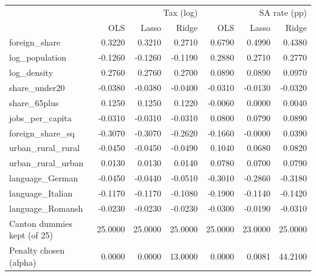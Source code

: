 \begin{tabular}{lrrrrrr}
\toprule
 & \multicolumn{3}{r}{Tax (log)} & \multicolumn{3}{r}{SA rate (pp)} \\
 & OLS & Lasso & Ridge & OLS & Lasso & Ridge \\
\midrule
foreign\_share & 0.3220 & 0.3210 & 0.2710 & 0.6790 & 0.4990 & 0.4380 \\
log\_population & -0.1260 & -0.1260 & -0.1190 & 0.2880 & 0.2710 & 0.2770 \\
log\_density & 0.2760 & 0.2760 & 0.2700 & 0.0890 & 0.0890 & 0.0970 \\
share\_under20 & -0.0380 & -0.0380 & -0.0400 & -0.0310 & -0.0130 & -0.0320 \\
share\_65plus & 0.1250 & 0.1250 & 0.1220 & -0.0060 & 0.0000 & 0.0040 \\
jobs\_per\_capita & -0.0310 & -0.0310 & -0.0310 & 0.0800 & 0.0790 & 0.0890 \\
foreign\_share\_sq & -0.3070 & -0.3070 & -0.2620 & -0.1660 & -0.0000 & 0.0390 \\
urban\_rural\_rural & -0.0450 & -0.0450 & -0.0490 & 0.1040 & 0.0680 & 0.0820 \\
urban\_rural\_urban & 0.0130 & 0.0130 & 0.0140 & 0.0780 & 0.0700 & 0.0790 \\
language\_German & -0.0450 & -0.0440 & -0.0510 & -0.3010 & -0.2860 & -0.3180 \\
language\_Italian & -0.1170 & -0.1170 & -0.1080 & -0.1900 & -0.1140 & -0.1420 \\
language\_Romansh & -0.0230 & -0.0230 & -0.0230 & -0.0300 & -0.0190 & -0.0310 \\
Canton dummies kept (of 25) & 25.0000 & 25.0000 & 25.0000 & 25.0000 & 23.0000 & 25.0000 \\
Penalty chosen (alpha) & 0.0000 & 0.0000 & 13.0000 & 0.0000 & 0.0081 & 44.2100 \\
\bottomrule
\end{tabular}
